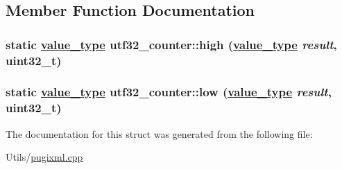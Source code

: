 \subsection{Member Function Documentation}
\hypertarget{structutf32__counter_a72f5248b1dc5937330ab049bf449251}{
\subsubsection[high]{\setlength{\rightskip}{0pt plus 5cm}static \hyperlink{structutf32__counter_6fb6728fe1a009958000f0e934fa6500}{value\_\-type} utf32\_\-counter::high (\hyperlink{structutf32__counter_6fb6728fe1a009958000f0e934fa6500}{value\_\-type} {\em result}, uint32\_\-t)}}
\label{structutf32__counter_a72f5248b1dc5937330ab049bf449251}


\hypertarget{structutf32__counter_3a75f4840e0391ed972ddba621d49480}{
\subsubsection[low]{\setlength{\rightskip}{0pt plus 5cm}static \hyperlink{structutf32__counter_6fb6728fe1a009958000f0e934fa6500}{value\_\-type} utf32\_\-counter::low (\hyperlink{structutf32__counter_6fb6728fe1a009958000f0e934fa6500}{value\_\-type} {\em result}, uint32\_\-t)}}
\label{structutf32__counter_3a75f4840e0391ed972ddba621d49480}




The documentation for this struct was generated from the following file:\begin{CompactItemize}
\item 
Utils/\hyperlink{pugixml_8cpp}{pugixml.cpp}\end{CompactItemize}

